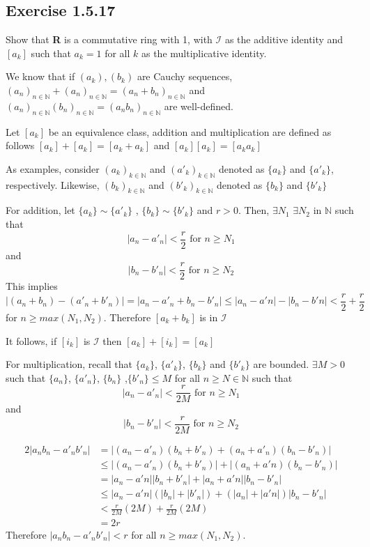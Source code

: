 \documentclass{tufte-book}
\theoremstyle{mytheoremstyle}
\theoremstyle{mylemstyle}
\newtheorem*{lem}{Lem.}
\theoremstyle{mydefstyle}
\begin{document}
\subsection{Exercise 1.5.17}
Show that \textbf{R} is a commutative ring with 1, with $\mathcal{I}$ as the additive identity and $[a_k]$ such that $a_k=1$ for all $k$ as the multiplicative identity.

We know that if $(a_k),(b_k)$ are Cauchy sequences, $(a_n)_{n \in \mathbb{N}} +(a_n)_{n \in \mathbb{N}}=(a_n + b_n)_{n \in \mathbb{N}}$ and $(a_n)_{n \in \mathbb{N}}(b_n)_{n \in \mathbb{N}}=(a_nb_n)_{n \in \mathbb{N}}$ are well-defined.

Let $[a_k]$ be an equivalence class, addition and multiplication are defined as follows $[a_k]+[a_k] = [a_k+a_k]$ and $[a_k][a_k] = [a_k a_k]$

As examples, consider $(a_k)_{k \in \mathbb{N}}$ and $(a'_k)_{k \in \mathbb{N}}$ denoted as $\{a_k\}$ and $\{a'_k\}$, respectively. Likewise, $(b_k)_{k \in \mathbb{N}}$ and $(b'_k)_{k \in \mathbb{N}}$ denoted as $\{b_k\}$ and $\{b'_k\}$  

For addition, let $\{a_k\} \sim \{a'_k\}$ , $\{b_k\} \sim \{b'_k\}$ and $r>0$.  Then, $\exists N_1$ $\exists N_2$ in $\mathbb{N}$ such that
\[|a_n-a'_n| < \frac{r}{2} \text{ for } n \geq N_1 \]
and
\[|b_n-b'_n| < \frac{r}{2} \text{ for } n \geq N_2 \]
This implies
\[|(a_n+b_n) - (a'_n + b'_n)| = |a_n - a'_n + b_n - b'_n| \leq |a_n-a'n| - |b_n - b'n| < \frac{r}{2} + \frac{r}{2} \] 
for $n \geq max(N_1,N_2)$.  Therefore $[a_k + b_k]$ is in $\mathcal{I}$ 

It follows, if $[i_k]$ is $\mathcal{I}$ then $[a_k] + [i_k] = [a_k]$

For multiplication, recall that $\{a_k\}$, $\{a'_k\}$, $\{b_k\}$ and $\{b'_k\}$ are bounded. $\exists M >0$ such that  $\{a_n\}$, $\{a'_n\}$, $\{b_n\}$ ,$\{b'_n\} \leq M$ for all $n \geq N \in \mathbb{N}$ such that
\[|a_n - a'_n| < \frac{r}{2M} \text{ for } n \geq N_1 \]
and
\[|b_n - b'_n| < \frac{r}{2M} \text{ for } n \geq N_2 \]

\begin{align*}
2|a_nb_n - a'_nb'_n| & = |(a_n-a'_n)(b_n+b'_n) + (a_n+a'_n)(b_n-b'_n)|
\\& \leq |(a_n-a'_n)(b_n+b'_n)| + |(a_n+a'n)(b_n-b'_n)|
\\& = |a_n-a'n||b_n+b'_n| + |a_n+a'n||b_n-b'_n|
\\& \leq |a_n-a'n|(|b_n|+|b'_n|) + (|a_n|+|a'n|)|b_n-b'_n|
\\& < \frac{r}{2M}(2M) + \frac{r}{2M}(2M)
\\& = 2r
\end{align*}
Therefore $|a_nb_n - a'_nb'_n| < r$ for all $n \geq max(N_1,N_2)$.  
\end{document}
